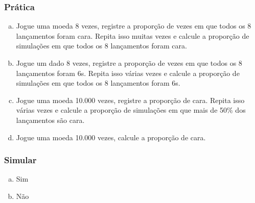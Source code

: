 \begin{frame}
\frametitle{Prática}
\justifying
{}

\begin{enumerate}[(a)]
\justifying
\item Jogue uma moeda 8 vezes, registre a proporção de vezes em que todos os 8 lançamentos foram cara. Repita isso muitas vezes e calcule a proporção de simulações em que todos os 8 lançamentos foram cara.
\justifying
\item Jogue um dado 8 vezes, registre a proporção de vezes em que todos os 8 lançamentos foram 6s. Repita isso várias vezes e calcule a proporção de simulações em que todos os 8 lançamentos foram 6s.
\justifying
\item Jogue uma moeda 10.000 vezes, registre a proporção de cara. Repita isso várias vezes e calcule a proporção de simulações em que mais de 50\% dos lançamentos são cara.
\justifying
\item Jogue uma moeda 10.000 vezes, calcule a proporção de cara.
\end{enumerate}

\end{frame}


\begin{frame}
\frametitle{Simular}
\justifying
{}

\begin{enumerate}[(a)]
\item Sim
\item Não
\end{enumerate}

\end{frame}


